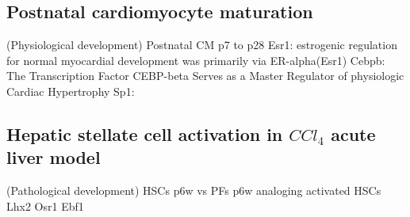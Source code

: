 \documentclass[fleqn,10pt]{wlscirep}
\begin{document}
  \subsection*{Postnatal cardiomyocyte maturation}
  (Physiological development)
  Postnatal CM p7 to p28
  Esr1: estrogenic regulation for normal myocardial development was primarily via ER-alpha(Esr1)
  Cebpb: The Transcription Factor CEBP-beta Serves as a Master Regulator of physiologic Cardiac Hypertrophy
  Sp1:

  \subsection*{Hepatic stellate cell activation in $CCl_4$ acute liver model}
  (Pathological development)
  HSCs p6w vs PFs p6w analoging activated HSCs
  Lhx2
  Osr1
  Ebf1
\end{document}
